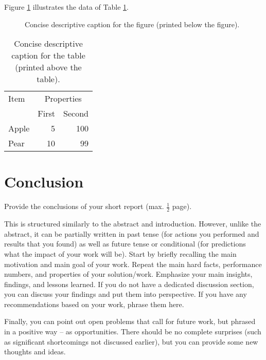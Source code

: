 \documentclass[11pt,
  titlepage=false,
  abstract=on,
]{scrreprt}
\begin{document}
Figure \ref{fig:diagram} illustrates the data of Table \ref{tab:data}.

\begin{figure}[htpb]
  \centering
  \caption{Concise descriptive caption for the figure (printed below the figure).}
  \label{fig:diagram}
\end{figure}

\begin{table}[b]
  \caption{Concise descriptive caption for the table (printed above the table).}
  \label{tab:data}
  \centering
  \begin{tabular}{lrr} %
    \toprule
    Item   & \multicolumn{2}{c}{Properties} \\
             \cmidrule{2-3}
           & First          & Second \\
    \midrule
    Apple  & 5              & 100 \\
    Pear   & 10             & 99 \\
    \bottomrule
  \end{tabular}
\end{table}



\section{Conclusion}
\label{sec:conclusion}

Provide the conclusions of your short report (max. $\frac{1}{2}$ page).

This is structured similarly to the abstract and introduction.
However, unlike the abstract, it can be partially written in past tense (for actions you performed and results that you found) as well as future tense or conditional (for predictions what the impact of your work will be).
Start by briefly recalling the main motivation and main goal of your work.
Repeat the main hard facts, performance numbers, and properties of your solution/work.
%
Emphasize your main insights, findings, and lessons learned.
If you do not have a dedicated discussion section, you can discuss your findings and put them into perspective.
If you have any recommendations based on your work, phrase them here.

Finally, you can point out open problems that call for future work, but phrased in a positive way -- as opportunities.
There should be no complete surprises (such as significant shortcomings not discussed earlier), but you can provide some new thoughts and ideas.



\printbibliography[heading=subbibliography]
\end{document}
